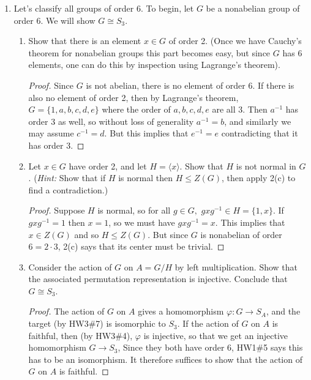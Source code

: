 \documentclass[11pt]{article}
\newcommand{\la}{\langle}
\newcommand{\ra}{\rangle}
\begin{document}
\begin{enumerate}
\begin{enumerate}
\begin{proof}
    \end{proof}
  \end{enumerate}
  \item Let's classify all groups of order 6.  To begin, let $G$ be a nonabelian group of order $6$.  We will show $G\cong S_3$.
  \begin{enumerate}
    \item Show that there is an element $x\in G$ of order 2.  (Once we have Cauchy's theorem for nonabelian groups this part becomes easy, but since $G$ has 6 elements, one can do this by inspection using Lagrange's theorem).
    \begin{proof}
      Since $G$ is not abelian, there is no element of order 6.  If there is also no element of order 2, then by Lagrange's theorem, $G = \{1,a,b,c,d,e\}$ where the order of $a,b,c,d,e$ are all 3.  Then $a^{-1}$ has order 3 as well, so without loss of generality $a^{-1}=b$, and similarly we may assume $c^{-1}=d$.  But this implies that $e^{-1}=e$ contradicting that it has order 3.
    \end{proof}
    \item Let $x\in G$ have order 2, and let $H = \la x\ra$.  Show that $H$ is not normal in $G$.  (\textit{Hint:} Show that if $H$ is normal then $H\le Z(G)$, then apply 2(c) to find a contradiction.)
    \begin{proof}
      Suppose $H$ is normal, so for all $g\in G,$ $gxg^{-1}\in H = \{1,x\}$.  If $gxg^{-1} = 1$ then $x=1$, so we must have $gxg^{-1} = x$.  This implies that $x\in Z(G)$ and so $H\le Z(G)$.  But since $G$ is nonabelian of order $6 = 2\cdot 3$, 2(c) says that its center must be trivial.
    \end{proof}
    \item Consider the action of $G$ on $A = G/H$ by left multiplication.  Show that the associated permutation representation is injective.  Conclude that $G\cong S_3$.
    \begin{proof}
      The action of $G$ on $A$ gives a homomorphism $\varphi:G\to S_A$, and the target (by HW3\#7) is isomorphic to $S_3$.  If the action of $G$ on $A$ is faithful, then (by HW3\#4), $\varphi$ is injective, so that we get an injective homomorphism $G\to S_3$,  Since they both have order 6, HW1\#5 says this has to be an isomorphism.  It therefore suffices to show that the action of $G$ on $A$ is faithful.


\end{proof}
\end{enumerate}
\end{enumerate}
\end{document}
